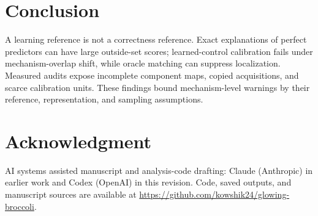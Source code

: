 \documentclass[conference]{IEEEtran}
\begin{document}
\section{Conclusion}
A learning reference is not a correctness reference. Exact explanations of perfect predictors can have large outside-set scores; learned-control calibration fails under mechanism-overlap shift, while oracle matching can suppress localization. Measured audits expose incomplete component maps, copied acquisitions, and scarce calibration units. These findings bound mechanism-level warnings by their reference, representation, and sampling assumptions.

\section*{Acknowledgment}
AI systems assisted manuscript and analysis-code drafting: Claude (Anthropic) in earlier work and Codex (OpenAI) in this revision. Code, saved outputs, and manuscript sources are available at \url{https://github.com/kowshik24/glowing-broccoli}.



\end{document}
